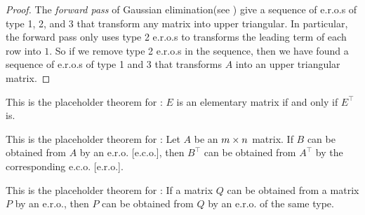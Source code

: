 \begin{proof}
The \emph{forward pass} of Gaussian elimination(see ) give a sequence of e.r.o.s of type 1, 2, and 3 that transform any matrix into upper triangular.
In particular, the forward pass only uses type 2 e.r.o.s to transforms the leading term of each row into \(1\).
So if we remove type 2 e.r.o.s in the sequence, then we have found a sequence of e.r.o.s of type 1 and 3 that transforms \(A\) into an upper triangular matrix.
\end{proof}

\begin{additional theorem} \label{athm 3.1}
This is the placeholder theorem for : \(E\) is an elementary matrix if and only if \(E^\top\) is.
\end{additional theorem}

\begin{additional theorem} \label{athm 3.2}
This is the placeholder theorem for : Let \(A\) be an \(m \times n\) matrix.
If \(B\) can be obtained from \(A\) by an e.r.o. [e.c.o.], then \(B^\top\) can be obtained from \(A^\top\) by the corresponding e.c.o. [e.r.o.].
\end{additional theorem}

\begin{additional theorem} \label{athm 3.3}
This is the placeholder theorem for : If a matrix \(Q\) can be obtained from a matrix \(P\) by an e.r.o., then \(P\) can be obtained from \(Q\) by an e.r.o. of the same type.
\end{additional theorem}
